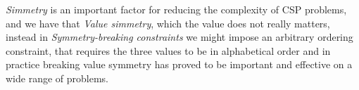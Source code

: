 \emph{Simmetry} is an important factor for reducing the complexity of CSP problems, and 
we have that \emph{Value simmetry}, which the value does not really matters, instead
in \emph{Symmetry-breaking constraints} we might impose an arbitrary ordering constraint,
that requires the three values to be in alphabetical order and in practice 
breaking value symmetry has proved to be important and effective on a wide range 
of problems.


